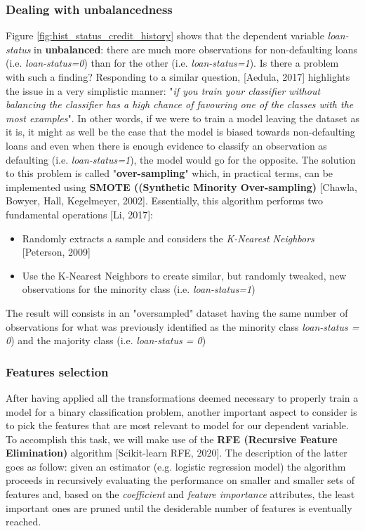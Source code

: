 \documentclass[a4paper,12pt]{article}
\begin{document}
        \subsubsection{Dealing with unbalancedness}
        Figure \ref{fig:hist_status_credit_history} shows that the dependent variable \textit{loan-status} in 
        \textbf{unbalanced}: there are much more observations for non-defaulting loans (i.e. \textit{loan-status=0}) than for the other (i.e. \textit{loan-status=1}).
        Is there a problem with such a finding? Responding to a similar question, [Aedula, 2017] highlights the issue in a very simplistic manner:
        "\textit{if you train your classifier without balancing the classifier has a high chance of favouring one of the classes with the most examples}".
        In other words, if we were to train a model leaving the dataset as it is, it might as well be the case that the model is biased towards non-defaulting loans and even when there is enough evidence to classify an observation as defaulting (i.e. \textit{loan-status=1}), the model would go for the opposite. The solution to this problem is called "\textbf{over-sampling}" which, in practical terms, can be implemented using 
        \textbf{SMOTE ((Synthetic Minority Over-sampling)}  [Chawla, Bowyer, Hall, Kegelmeyer, 2002]. 
        Essentially, this algorithm performs two fundamental operations [Li, 2017]:

        \begin{itemize}
            \item Randomly extracts a sample and considers the \textit{K-Nearest Neighbors} [Peterson, 2009]
            \item Use the K-Nearest Neighbors to create similar, but randomly tweaked, new observations for the minority class (i.e. \textit{loan-status=1})
        \end{itemize}

        The result will consists in an "oversampled" dataset having the same number of observations for what 
        was previously identified as the minority class \textit{loan-status = 0}) and the majority class (i.e. \textit{loan-status = 0})

        \subsubsection{Features selection}
        After having applied all the transformations deemed necessary to properly train a model for a binary classification problem, another 
        important aspect to consider is to pick the features that are most relevant to model for our dependent variable. 
        To accomplish this task, we will make use of the \textbf{RFE (Recursive Feature Elimination)} algorithm [Scikit-learn RFE, 2020].
        The description of the latter goes as follow: given an estimator (e.g. logistic regression model) the algorithm proceeds in recursively 
        evaluating the performance on smaller and smaller sets of features and, 
        based on the \textit{coefficient} and \textit{feature importance} attributes, the least important ones 
        are pruned until the desiderable number of features is eventually reached.  
        
\end{document}
